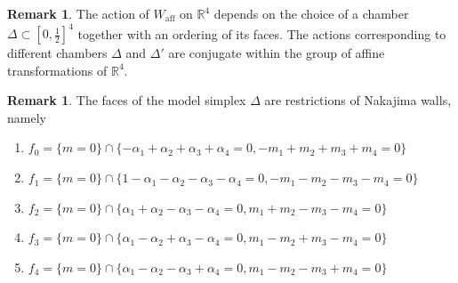 \documentclass[12pt,letterpaper,reqno]{amsart}
\def\mathbf#1{#1}%
\theoremstyle{remark}
\theoremstyle{definition}
\newtheorem{rem}[thm]{Remark}
\numberwithin{thm}{section}
\numberwithin{equation}{section}
\numberwithin{figure}{section}
\newcommand{\R}{\ensuremath{\mathbb R}}
\newcommand{\bfm}{\mathbf{m}}
\begin{document}
 \begin{rem}
 The action of $W_{\mathrm{aff}}$ on $\R^4$ depends on the choice of a chamber $\Delta \subset [0, \frac 12]^4$ together with an ordering of its faces. The actions corresponding to different chambers $\Delta$ and $\Delta'$ are conjugate within the group of affine transformations of $\R^4$.
\end{rem}
   
 \begin{rem} \label{rem:Nakajima} The faces of the model simplex $\Delta$ are restrictions of Nakajima walls, namely
\begin{enumerate}
\item $f_0=\{\bfm = \mathbf{0}\} \cap \{ -\alpha_1+\alpha_2+\alpha_3+\alpha_4 = 0, -m_1+m_2+m_3+m_4=0\} $	
\item $f_1=\{\bfm = \mathbf{0}\}\cap \{1- \alpha_1-\alpha_2-\alpha_3 - \alpha_4 = 0, -m_1-m_2-m_3-m_4=0\}$
\item $f_2=\{\bfm = \mathbf{0}\} \cap \{\alpha_1+\alpha_2-\alpha_3-\alpha_4=0, m_1+m_2-m_3-m_4 =0\}$
\item $f_3=\{\bfm = \mathbf{0}\} \cap\{\alpha_1-\alpha_2+\alpha_3-\alpha_4=0, m_1-m_2+m_3-m_4 =0\}$
\item $f_4=\{\bfm = \mathbf{0}\} \cap\{\alpha_1-\alpha_2-\alpha_3+\alpha_4=0, m_1-m_2-m_3+m_4 =0\}$
\end{enumerate}
 
\end{rem}
\end{document}
